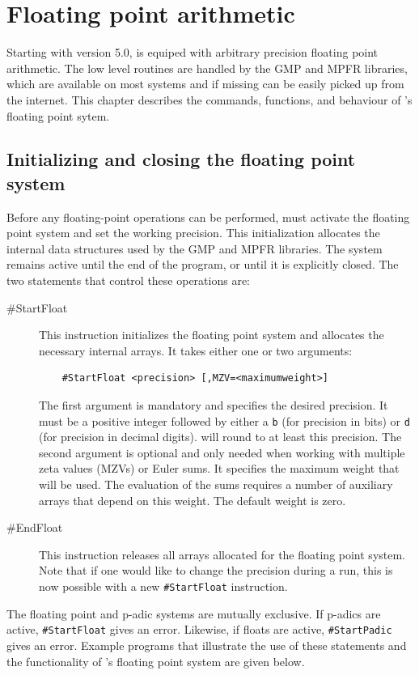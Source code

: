 
\chapter{Floating point arithmetic}
\label{floatingpoint}

Starting with version 5.0, \FORM{} is equiped with arbitrary precision floating point 
arithmetic. The low level routines are handled by the GMP and MPFR libraries, 
which are available on most systems and if missing can be easily picked up 
from the internet. This chapter describes the commands, functions, and behaviour
of \FORM's floating point sytem.

\section{Initializing and closing the floating point system}
Before any floating-point operations can be performed, \FORM{} must activate the 
floating point system and set the working precision. This initialization allocates 
the internal data structures used by the GMP and MPFR libraries. The system remains 
active until the end of the program, or until it is explicitly closed.
The two statements that control these operations are:
\begin{description}
\item[\#StartFloat] This instruction initializes the floating 
point system and allocates the necessary internal arrays. 
It takes either one or two arguments:
\begin{verbatim}
    #StartFloat <precision> [,MZV=<maximumweight>]
\end{verbatim}
The first argument is mandatory and specifies the desired precision. It must 
be a positive integer followed by either a \texttt{b} (for precision in bits) 
or \texttt{d} (for precision in decimal digits).
\FORM{} will round to at least this precision. 
The second argument is optional and only needed when working with multiple 
zeta values (MZVs) or Euler sums. It specifies the maximum weight 
that will be used. The evaluation of the sums requires a 
number of auxiliary arrays that depend on this weight. The default weight is zero. 
\item[\#EndFloat] This instruction releases all arrays allocated for the 
floating point system. Note that if one would like to change the precision during a run, 
this is now possible with a new \texttt{\#StartFloat} instruction. 
\end{description}
The floating point and p-adic systems are mutually exclusive. If p-adics are
active, \texttt{\#StartFloat} gives an error. Likewise, if floats are active,
\texttt{\#StartPadic} gives an error.
Example programs that illustrate the use of these statements and the 
functionality of \FORM's floating point system are given below. 


